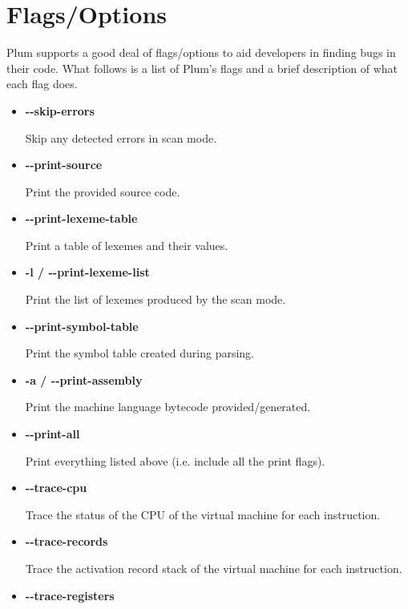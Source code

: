 \documentclass[12pt]{memoir}
\begin{document}
\pagebreak

\section*{Flags/Options}
Plum supports a good deal of flags/options to aid developers in finding bugs in their code.
What follows is a list of Plum's flags and a brief description of what each flag does.
\begin{itemize}
    \item \textbf{{-}{-}skip-errors}

        Skip any detected errors in scan mode.

    \item \textbf{{-}{-}print-source}

        Print the provided source code.

    \item \textbf{{-}{-}print-lexeme-table}
        
        Print a table of lexemes and their values.

    \item \textbf{-l / {-}{-}print-lexeme-list}

        Print the list of lexemes produced by the scan mode.

    \item \textbf{{-}{-}print-symbol-table}

        Print the symbol table created during parsing.

    \item \textbf{-a / {-}{-}print-assembly}
    
        Print the machine language bytecode provided/generated.

    \item \textbf{{-}{-}print-all}
        
        Print everything listed above (i.e. include all the print flags).

    \item \textbf{{-}{-}trace-cpu}
    
        Trace the status of the CPU of the virtual machine for each instruction.

    \item \textbf{{-}{-}trace-records}

        Trace the activation record stack of the virtual machine for each instruction.

    \item \textbf{{-}{-}trace-registers}


\end{itemize}
\end{document}
